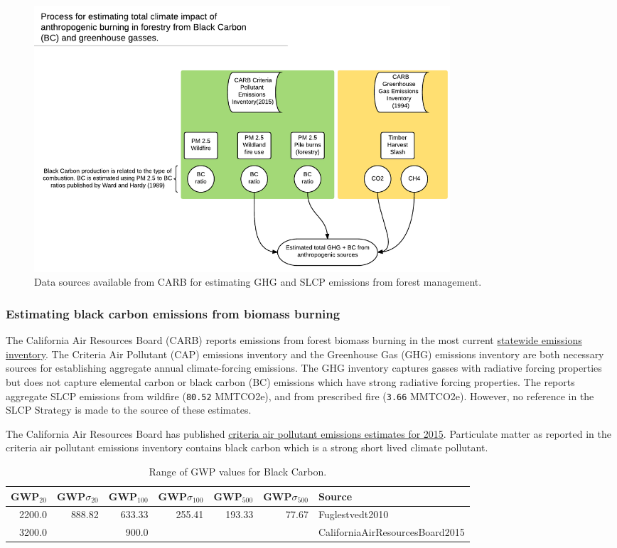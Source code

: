 \documentclass[a4paper]{article}
\begin{document}
\begin{figure}[htb]
\centering
\includegraphics[width=0.75\textwidth]{./graphics/burning.pdf}
\caption{Data sources available from CARB for estimating GHG and SLCP emissions from forest management. \label{fig:wood_fates}}
\end{figure}


\subsubsection{Estimating black carbon emissions from biomass burning}
\label{sec:orgheadline3}

The California Air Resources Board (CARB) reports
emissions from forest biomass burning  in the most current
\href{http://www.arb.ca.gov/ei/ei.htm}{statewide emissions inventory}. The Criteria Air
Pollutant (CAP) emissions inventory and the Greenhouse Gas (GHG)
emissions inventory are both necessary sources for establishing
aggregate annual climate-forcing emissions. The GHG inventory captures
gasses with radiative forcing properties but does not capture elemental
carbon or black carbon (BC) emissions which have strong radiative
forcing properties. The \citet{CaliforniaAirResourcesBoard2015,CaliforniaAirResourcesBoard2016}
reports aggregate SLCP emissions from wildfire
(\texttt{80.52} MMTCO2e), and from prescribed fire
(\texttt{3.66} MMTCO2e). However, no reference in the
SLCP Strategy is made to the source of these estimates.

The California Air Resources Board has published
\href{http://www.arb.ca.gov/ei/emissiondata.htm}{criteria air pollutant
emissions estimates for 2015}. Particulate matter as reported in the
criteria air pollutant emissions inventory contains black carbon which
is a strong short lived climate pollutant.


\begin{table}[htb]
\centering
\begin{tabular}{rrrrrrl}
GWP\(_{\text{20}}\) & GWP\(\sigma_{\text{20}}\) & GWP\(_{\text{100}}\) & GWP\(\sigma_{\text{100}}\) & GWP\(_{\text{500}}\) & GWP\(\sigma_{\text{500}}\) & Source\\
\hline
2200.0 & 888.82 & 633.33 & 255.41 & 193.33 & 77.67 & Fuglestvedt2010\\
3200.0 &  & 900.0 &  &  &  & CaliforniaAirResourcesBoard2015\\
\end{tabular}
\caption{Range of GWP values for Black Carbon.}

\end{table}
\end{document}

